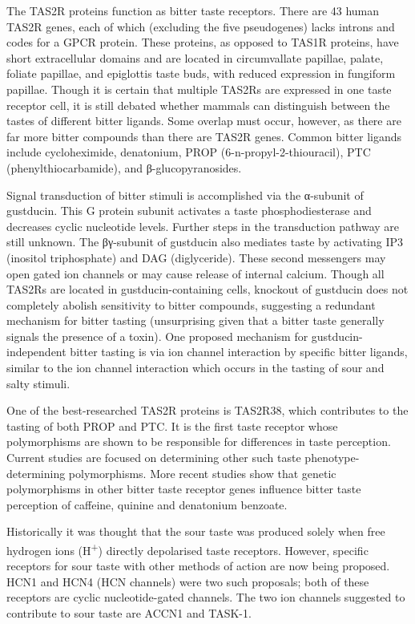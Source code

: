The TAS2R proteins function as bitter taste receptors. There are 43 human TAS2R genes, each of which (excluding the five pseudogenes) lacks introns and codes for a GPCR protein. These proteins, as opposed to TAS1R proteins, have short extracellular domains and are located in circumvallate papillae, palate, foliate papillae, and epiglottis taste buds, with reduced expression in fungiform papillae. Though it is certain that multiple TAS2Rs are expressed in one taste receptor cell, it is still debated whether mammals can distinguish between the tastes of different bitter ligands. Some overlap must occur, however, as there are far more bitter compounds than there are TAS2R genes. Common bitter ligands include cycloheximide, denatonium, PROP (6-n-propyl-2-thiouracil), PTC (phenylthiocarbamide), and β-glucopyranosides.

Signal transduction of bitter stimuli is accomplished via the α-subunit of gustducin. This G protein subunit activates a taste phosphodiesterase and decreases cyclic nucleotide levels. Further steps in the transduction pathway are still unknown. The βγ-subunit of gustducin also mediates taste by activating IP3 (inositol triphosphate) and DAG (diglyceride). These second messengers may open gated ion channels or may cause release of internal calcium. Though all TAS2Rs are located in gustducin-containing cells, knockout of gustducin does not completely abolish sensitivity to bitter compounds, suggesting a redundant mechanism for bitter tasting (unsurprising given that a bitter taste generally signals the presence of a toxin). One proposed mechanism for gustducin-independent bitter tasting is via ion channel interaction by specific bitter ligands, similar to the ion channel interaction which occurs in the tasting of sour and salty stimuli.

One of the best-researched TAS2R proteins is TAS2R38, which contributes to the tasting of both PROP and PTC. It is the first taste receptor whose polymorphisms are shown to be responsible for differences in taste perception. Current studies are focused on determining other such taste phenotype-determining polymorphisms. More recent studies show that genetic polymorphisms in other bitter taste receptor genes influence bitter taste perception of caffeine, quinine and denatonium benzoate.

Historically it was thought that the sour taste was produced solely when free hydrogen ions (H\textsuperscript{+}) directly depolarised taste receptors. However, specific receptors for sour taste with other methods of action are now being proposed. HCN1 and HCN4 (HCN channels) were two such proposals; both of these receptors are cyclic nucleotide-gated channels. The two ion channels suggested to contribute to sour taste are ACCN1 and TASK-1.

